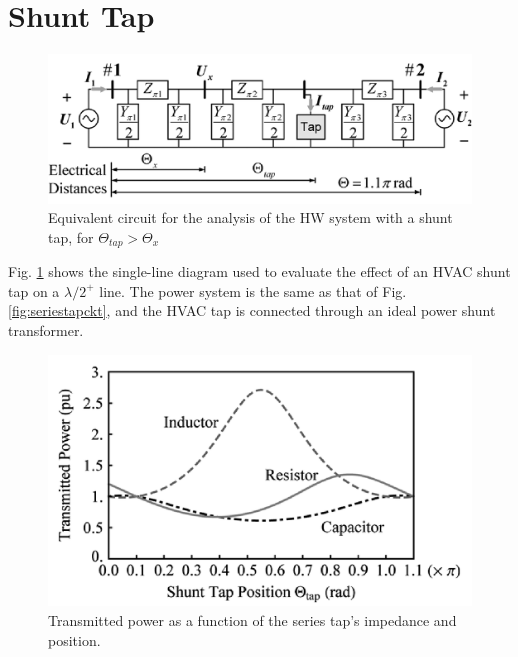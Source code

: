 \documentclass[12pt,a4paper]{reportmod}
\begin{document}
\section{Shunt Tap}
\begin{figure}[h]
\label{fig:shunttapckt}
\begin{center}
\includegraphics[scale=0.3]{shunttapckt.png}
\caption{Equivalent circuit for the analysis of the HW system with a shunt tap, for $\Theta_{tap} > \Theta_x $ }
\end{center}
\end{figure}
\par Fig. \ref{fig:shunttapckt} shows the single-line diagram used to evaluate the effect of an HVAC shunt tap on a $\lambda /2^+$ line. The power system is the same as that of Fig. \ref{fig:seriestapckt}, and the HVAC tap is connected through an ideal power shunt transformer.
\begin{figure}[h]
\label{fig:shunttappower}
\begin{center}
\includegraphics[scale=0.3]{shunttappower.png}
\caption{Transmitted power as a function of the series tap’s impedance and position.}
\end{center}
\end{figure}
\end{document}
